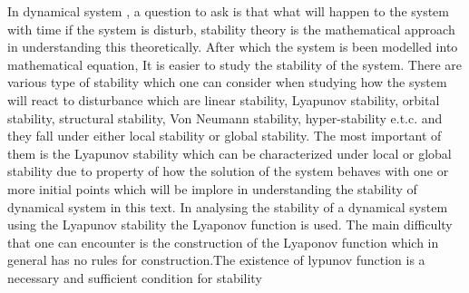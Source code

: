 \documentclass[a4paper,12pt]{report}
\numberwithin{equation}{section}
\begin{document}
In dynamical system , a question to ask is that what will happen to the system with  time if the system is disturb, stability theory is the mathematical approach in understanding this theoretically. After which the system is been modelled into mathematical equation, It is easier to study the stability of the system. There are various type of stability which one can consider when studying how the system will react to disturbance which are linear stability, Lyapunov stability, orbital stability, structural stability, Von Neumann stability, hyper-stability e.t.c. and they fall under either local stability or global stability. The most important of them is the Lyapunov stability which can be characterized under local or global stability due to property of how the solution of the system behaves with one or more initial points which will be implore in understanding the stability of dynamical system in this text. In analysing   
the stability of a dynamical system using the Lyapunov stability the Lyaponov function is used. The main difficulty that one can encounter is the construction of the Lyaponov function which in general has no rules for construction.The existence of lypunov function is a necessary and sufficient condition for stability
\end{document}
